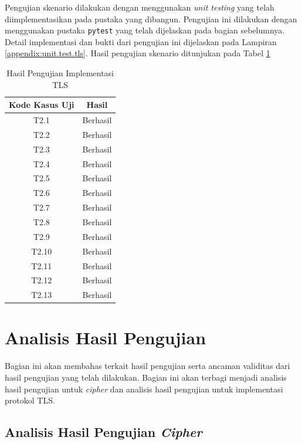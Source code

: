 Pengujian skenario dilakukan dengan menggunakan \emph{unit testing} yang telah diimplementasikan pada pustaka yang dibangun. Pengujian ini dilakukan dengan menggunakan pustaka \texttt{pytest} yang telah dijelaskan pada bagian sebelumnya. Detail implementasi dan bukti dari pengujian ini dijelaskan pada Lampiran \ref{appendix:unit.test.tls}. Hasil pengujian skenario ditunjukan pada Tabel \ref{tab:test.result.tls}

\begin{table}[!h]
  \centering
  \caption{Hasil Pengujian Implementasi TLS} \label{tab:test.result.tls}
  \begin{tabular}{|c|c|}
    \hline
    \textbf{Kode Kasus Uji} & \textbf{Hasil} \\ \hline
    T2.1 & Berhasil \\ \hline
    T2.2 & Berhasil \\ \hline
    T2.3 & Berhasil \\ \hline
    T2.4 & Berhasil \\ \hline
    T2.5 & Berhasil \\ \hline
    T2.6 & Berhasil \\ \hline
    T2.7 & Berhasil \\ \hline
    T2.8 & Berhasil \\ \hline
    T2.9 & Berhasil \\ \hline
    T2.10 & Berhasil \\ \hline
    T2.11 & Berhasil \\ \hline
    T2.12 & Berhasil \\ \hline
    T2.13 & Berhasil \\ \hline
  \end{tabular}
\end{table}

\section{Analisis Hasil Pengujian} 
\label{sec:analisis-hasil-pengujian}

Bagian ini akan membahas terkait hasil pengujian serta ancaman validitas dari hasil pengujian yang telah dilakukan. Bagian ini akan terbagi menjadi analisis hasil pengujian untuk \emph{cipher} dan analisis hasil pengujian untuk implementasi protokol TLS.

\subsection{Analisis Hasil Pengujian \emph{Cipher}}

